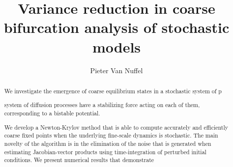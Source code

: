 \documentclass[]{article}
\title{Variance reduction in coarse bifurcation analysis of stochastic models}
\author{Pieter Van Nuffel}
\theoremstyle{definition}
\begin{document}
\maketitle{}

\begin{abstract}

We investigate the emergence of coarse equilibrium states in a stochastic system of p



 system of diffusion processes have a stabilizing force acting on each of them, corresponding to a bistable potential.

We develop a Newton-Krylov method that is able to compute accurately and efficiently coarse fixed points when the underlying fine-scale dynamics is stochastic. The main novelty of the algorithm is in the elimination of the noise that is generated when estimating Jacobian-vector products using time-integration of perturbed initial conditions. We present numerical results that demonstrate 
%
%
%

\end{abstract}
\end{document}
